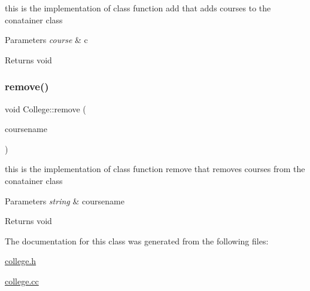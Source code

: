 this is the implementation of class function add that adds courses to the conatainer class 


\begin{DoxyParams}{Parameters}
{\em course} & c \\
\hline
\end{DoxyParams}
\begin{DoxyReturn}{Returns}
void 
\end{DoxyReturn}
\mbox{\label{class_college_a4d2ae513b36e6421fb1ca2c08459cfe6}} 
\subsubsection{\texorpdfstring{remove()}{remove()}}
{\footnotesize\ttfamily void College\+::remove (\begin{DoxyParamCaption}\item[{std\+::string}]{coursename }\end{DoxyParamCaption})}



this is the implementation of class function remove that removes courses from the conatainer class 


\begin{DoxyParams}{Parameters}
{\em string} & coursename \\
\hline
\end{DoxyParams}
\begin{DoxyReturn}{Returns}
void 
\end{DoxyReturn}


The documentation for this class was generated from the following files\+:\begin{DoxyCompactItemize}
\item 
\hyperlink{college_8h}{college.\+h}\item 
\hyperlink{college_8cc}{college.\+cc}\end{DoxyCompactItemize}
